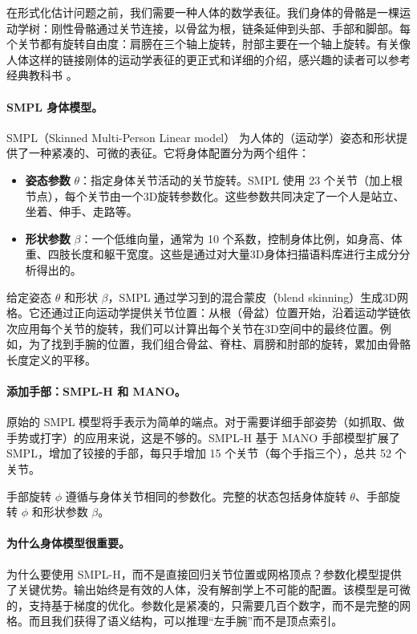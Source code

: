 \documentclass[../../book-main_zh.tex]{subfiles}
\begin{document}
在形式化估计问题之前，我们需要一种人体的数学表征。我们身体的骨骼是一棵运动学树：刚性骨骼通过关节连接，以骨盆为根，链条延伸到头部、手部和脚部。每个关节都有旋转自由度：肩膀在三个轴上旋转，肘部主要在一个轴上旋转。有关像人体这样的链接刚体的运动学表征的更正式和详细的介绍，感兴趣的读者可以参考经典教科书 \cite{MurrayR1994}。

\paragraph{SMPL 身体模型。}
SMPL（Skinned Multi-Person Linear model）\citep{loper2015smpl} 为人体的（运动学）姿态和形状提供了一种紧凑的、可微的表征。它将身体配置分为两个组件：
\begin{itemize}
    \item \textbf{姿态参数} $\theta$：指定身体关节活动的关节旋转。SMPL 使用 23 个关节（加上根节点），每个关节由一个3D旋转参数化。这些参数共同决定了一个人是站立、坐着、伸手、走路等。
    \item \textbf{形状参数} $\beta$：一个低维向量，通常为 10 个系数，控制身体比例，如身高、体重、四肢长度和躯干宽度。这些是通过对大量3D身体扫描语料库进行主成分分析得出的。
\end{itemize}

给定姿态 $\theta$ 和形状 $\beta$，SMPL 通过学习到的混合蒙皮（blend skinning）生成3D网格。它还通过正向运动学提供关节位置：从根（骨盆）位置开始，沿着运动学链依次应用每个关节的旋转，我们可以计算出每个关节在3D空间中的最终位置。例如，为了找到手腕的位置，我们组合骨盆、脊柱、肩膀和肘部的旋转，累加由骨骼长度定义的平移。

\paragraph{添加手部：SMPL-H 和 MANO。}
原始的 SMPL 模型将手表示为简单的端点。对于需要详细手部姿势（如抓取、做手势或打字）的应用来说，这是不够的。SMPL-H \citep{romero2017embodied} 基于 MANO 手部模型扩展了 SMPL，增加了铰接的手部，每只手增加 15 个关节（每个手指三个），总共 52 个关节。

手部旋转 $\phi$ 遵循与身体关节相同的参数化。完整的状态包括身体旋转 $\theta$、手部旋转 $\phi$ 和形状参数 $\beta$。

\paragraph{为什么身体模型很重要。}
为什么要使用 SMPL-H，而不是直接回归关节位置或网格顶点？参数化模型提供了关键优势。输出始终是有效的人体，没有解剖学上不可能的配置。该模型是可微的，支持基于梯度的优化。参数化是紧凑的，只需要几百个数字，而不是完整的网格。而且我们获得了语义结构，可以推理“左手腕”而不是顶点索引。
\end{document}
